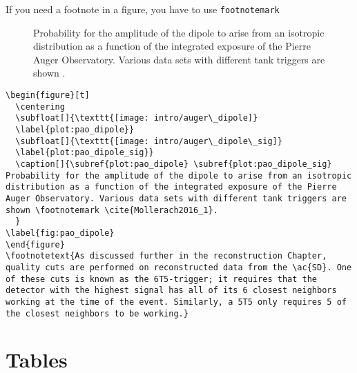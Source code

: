If you need a footnote in a figure, you have to use \verb!footnotemark!
%
\begin{figure}[t]
  \centering
  \caption[]{  Probability for the amplitude of the dipole to arise from an isotropic distribution as a function of the integrated exposure of the Pierre Auger Observatory. Various data sets with different tank triggers are shown \footnotemark \cite{Mollerach2016_1}.
  }
\label{fig:pao_dipole}
\end{figure}
\begin{lstlisting}
\begin{figure}[t]
  \centering
  \subfloat[]{\texttt{[image: intro/auger\_dipole]}
  \label{plot:pao_dipole}}
  \subfloat[]{\texttt{[image: intro/auger\_dipole\_sig]}
  \label{plot:pao_dipole_sig}}
  \caption[]{\subref{plot:pao_dipole} \subref{plot:pao_dipole_sig} Probability for the amplitude of the dipole to arise from an isotropic distribution as a function of the integrated exposure of the Pierre Auger Observatory. Various data sets with different tank triggers are shown \footnotemark \cite{Mollerach2016_1}.
  }
\label{fig:pao_dipole}
\end{figure}
\footnotetext{As discussed further in the reconstruction Chapter, quality cuts are performed on reconstructed data from the \ac{SD}. One of these cuts is known as the 6T5-trigger; it requires that the detector with the highest signal has all of its 6 closest neighbors working at the time of the event. Similarly, a 5T5 only requires 5 of the closest neighbors to be working.}
\end{lstlisting}



\section{Tables}

